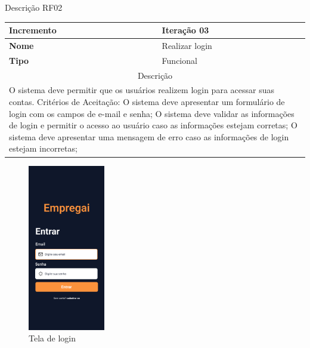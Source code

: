 \clearpage
\begin{quadro}[htb]
	\centering
	\caption{\label{Formatação do texto.}Descrição RF02}	
	\begin{tabular}{|l|p{11cm}|}
		\hline
		\textbf{Incremento}    & Iteração 03\\ \hline
		\textbf{Nome}    & Realizar login\\ \hline
		\textbf{Tipo}    & Funcional\\ \hline
		\multicolumn{2}{|c|}{Descrição}\\ \hline
		\multicolumn{2}{|p{12cm}|}{
			O sistema deve permitir que os usuários realizem login para acessar suas contas. \newline
			\newline Critérios de Aceitação: \newline
			O sistema deve apresentar um formulário de login com os campos de e-mail e senha; \newline
			\newline O sistema deve validar as informações de login e permitir o acesso ao usuário caso as informações estejam corretas;\newline
			\newline O sistema deve apresentar uma mensagem de erro caso as informações de login estejam incorretas;
			}\\ \hline
	\end{tabular}
\end{quadro}

\clearpage
\begin{figure}[htb]
	\caption{Tela de login}
	\begin{center}
		\includegraphics[width=0.3\textwidth]{images/RF02.png}
	\end{center}
\end{figure}

